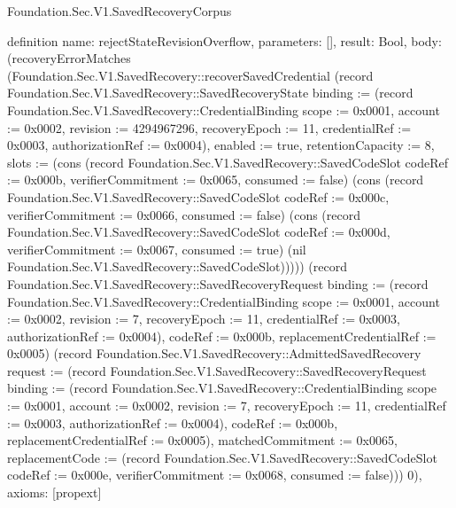 \begin{lexlean}{Foundation.Sec.V1.SavedRecoveryCorpus}
\begin{semanticmodule}
definition{
  name: rejectStateRevisionOverflow,
  parameters: [],
  result: Bool,
  body: (recoveryErrorMatches (Foundation.Sec.V1.SavedRecovery::recoverSavedCredential (record Foundation.Sec.V1.SavedRecovery::SavedRecoveryState {binding := (record Foundation.Sec.V1.SavedRecovery::CredentialBinding {scope := 0x0001, account := 0x0002, revision := 4294967296, recoveryEpoch := 11, credentialRef := 0x0003, authorizationRef := 0x0004}), enabled := true, retentionCapacity := 8, slots := (cons (record Foundation.Sec.V1.SavedRecovery::SavedCodeSlot {codeRef := 0x000b, verifierCommitment := 0x0065, consumed := false}) (cons (record Foundation.Sec.V1.SavedRecovery::SavedCodeSlot {codeRef := 0x000c, verifierCommitment := 0x0066, consumed := false}) (cons (record Foundation.Sec.V1.SavedRecovery::SavedCodeSlot {codeRef := 0x000d, verifierCommitment := 0x0067, consumed := true}) (nil Foundation.Sec.V1.SavedRecovery::SavedCodeSlot))))}) (record Foundation.Sec.V1.SavedRecovery::SavedRecoveryRequest {binding := (record Foundation.Sec.V1.SavedRecovery::CredentialBinding {scope := 0x0001, account := 0x0002, revision := 7, recoveryEpoch := 11, credentialRef := 0x0003, authorizationRef := 0x0004}), codeRef := 0x000b, replacementCredentialRef := 0x0005}) (record Foundation.Sec.V1.SavedRecovery::AdmittedSavedRecovery {request := (record Foundation.Sec.V1.SavedRecovery::SavedRecoveryRequest {binding := (record Foundation.Sec.V1.SavedRecovery::CredentialBinding {scope := 0x0001, account := 0x0002, revision := 7, recoveryEpoch := 11, credentialRef := 0x0003, authorizationRef := 0x0004}), codeRef := 0x000b, replacementCredentialRef := 0x0005}), matchedCommitment := 0x0065, replacementCode := (record Foundation.Sec.V1.SavedRecovery::SavedCodeSlot {codeRef := 0x000e, verifierCommitment := 0x0068, consumed := false})})) 0),
  axioms: [propext]
}


\end{semanticmodule}
\end{lexlean}
